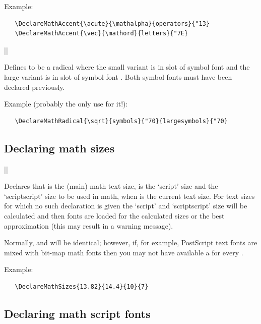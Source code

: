 \documentclass{ltxguide}[1995/11/28]
\begin{document}
Example:
\begin{verbatim}
   \DeclareMathAccent{\acute}{\mathalpha}{operators}{"13}
   \DeclareMathAccent{\vec}{\mathord}{letters}{"7E}
\end{verbatim}


\begin{decl}
  |\DeclareMathRadical| 
                         \\
            \null\hfill {} 
\end{decl}

Defines  to be a radical where the small variant is in slot
 of symbol font  and the large variant is in
slot  of symbol font .  Both symbol fonts must
have been declared previously.

Example (probably the only use for it!):
\begin{verbatim}
   \DeclareMathRadical{\sqrt}{symbols}{"70}{largesymbols}{"70}
\end{verbatim}

\subsection{Declaring math sizes}

\begin{decl}
  |\DeclareMathSizes|   
\end{decl}

Declares that  is the (main) math text size,  is
the `script' size and  the `scriptscript' size to be used in
math, when  is the current text size. For text sizes for which
no such declaration is given the `script' and `scriptscript' size will
be calculated and then fonts are loaded for the calculated sizes or the
best approximation (this may result in a warning message).

Normally,  and  will be identical; however, if, for
example, PostScript text fonts are mixed with bit-map math fonts then
you may not have available a  for every .

Example:
\begin{verbatim}
   \DeclareMathSizes{13.82}{14.4}{10}{7}
\end{verbatim}

\subsection{Declaring math script fonts}
\end{document}
